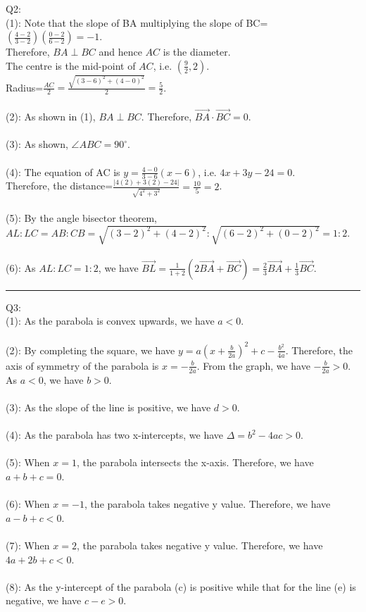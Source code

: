 \documentclass{article}
\begin{document}
\noindent Q2:\\
(1): Note that the slope of BA multiplying the slope of BC=$(\frac{4-2}{3-2})(\frac{0-2}{6-2})=-1$.\\
Therefore, $BA\perp BC$ and hence $AC$ is the diameter.\\
The centre is the mid-point of $AC$, i.e. $\boxed{(\frac{9}{2},2)}$.\\
Radius=$\frac{AC}{2}=\frac{\sqrt{(3-6)^2+(4-0)^2}}{2}=\boxed{\frac{5}{2}}$.\\
\\
(2): As shown in (1), $BA\perp BC$. Therefore, $\vec{BA}\cdot\vec{BC}=\boxed0$.\\
\\
(3): As shown, $\angle ABC=\boxed{90^\circ}$.\\
\\
(4): The equation of AC is $y=\frac{4-0}{3-6}(x-6)$, i.e. $4x+3y-24=0$.\\
Therefore, the distance=$\frac{|4(2)+3(2)-24|}{\sqrt{4^2+3^2}}=\frac{10}{5}=\boxed{2}$.\\
\\
(5): By the angle bisector theorem, $AL:LC=AB:CB=\sqrt{(3-2)^2+(4-2)^2}:\sqrt{(6-2)^2+(0-2)^2}=1:\boxed2$.\\
\\
(6): As $AL:LC=1:2$, we have $\vec{BL}=\frac{1}{1+2}(2\vec{BA}+\vec{BC})=\boxed{\frac{2}{3}}\vec{BA}+\boxed{\frac{1}{3}}\vec{BC}$.

\vspace{1cm}
\hrule
\vspace{1cm}

\noindent Q3:\\
(1): As the parabola is convex upwards, we have $a\boxed{<}0$.\\
\\
(2): By completing the square, we have $y=a(x+\frac{b}{2a})^2+c-\frac{b^2}{4a}$. Therefore, the axis of symmetry of the parabola is $x=-\frac{b}{2a}$. From the graph, we have $-\frac{b}{2a}>0$. As $a<0$, we have $b\boxed{>}0$.\\
\\
(3): As the slope of the line is positive, we have $d\boxed>0$.\\
\\
(4): As the parabola has two x-intercepts, we have $\Delta=b^2-4ac\boxed>0$.\\
\\
(5): When $x=1$, the parabola intersects the x-axis. Therefore, we have $a+b+c\boxed=0$.\\
\\
(6): When $x=-1$, the parabola takes negative y value. Therefore, we have $a-b+c\boxed<0$.\\
\\
(7): When $x=2$, the parabola takes negative y value. Therefore, we have $4a+2b+c\boxed<0$.\\
\\
(8): As the y-intercept of the parabola (c) is positive while that for the line (e) is negative, we have $c-e\boxed{>}0$.
\end{document}
